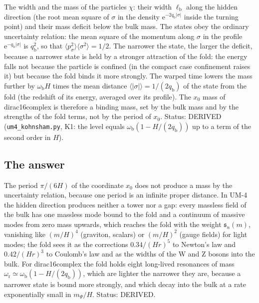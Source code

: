 \documentclass[
  10pt,
]{article}
\begin{document}
The width and the mass of the particles \(\chi\): their width
\(\ell_{\mathrm{b}}\) along the hidden direction (the root mean square
of \(\sigma\) in the density
\(\mathrm{e}^{-2q_{\mathrm{b}}\lvert\sigma\rvert}\) inside the turning
point) and their mass deficit below the bulk mass. The states obey the
ordinary uncertainty relation: the mean square of the momentum along
\(\sigma\) in the profile
\(\mathrm{e}^{-q_{\mathrm{b}}\lvert\sigma\rvert}\) is
\(q_{\mathrm{b}}^2\), so that
\(\langle p_\sigma^2\rangle\langle\sigma^2\rangle = 1/2\). The narrower
the state, the larger the deficit, because a narrower state is held by a
stronger attraction of the fold: the energy falls not because the
particle is confined (in the compact case confinement raises it) but
because the fold binds it more strongly. The warped time lowers the mass
further by \(\omega_{\mathrm{b}}H\) times the mean distance
\(\langle\lvert\sigma\rvert\rangle = 1/(2q_{\mathrm{b}})\) of the state
from the fold (the redshift of its energy, averaged over its profile).
The \(x_0\) mass of dirac16complex is therefore a binding mass, set by
the bulk mass and by the strengths of the fold terms, not by the period
of \(x_0\). Status: DERIVED (\texttt{um4\_kohnsham.py}, K1: the level
equals \(\omega_{\mathrm{b}}(1 - H/(2q_{\mathrm{b}}))\) up to a term of
the second order in \(H\)).

\hypertarget{the-answer}{%
\subsection{The answer}\label{the-answer}}

The period \(\pi/(6H)\) of the coordinate \(x_0\) does not produce a
mass by the uncertainty relation, because one period is an infinite
proper distance. In UM-4 the hidden direction produces neither a tower
nor a gap: every massless field of the bulk has one massless mode bound
to the fold and a continuum of massive modes from zero mass upwards,
which reaches the fold with the weight \(\mathfrak{s}_n(m)\), vanishing
like \((m/H)^4\) (graviton, scalars) or \((m/H)^2\) (gauge fields) for
light modes; the fold sees it as the corrections \(0.34/(Hr)^5\) to
Newton's law and \(0.42/(Hr)^3\) to Coulomb's law and as the widths of
the W and Z bosons into the bulk. For dirac16complex the fold holds
eight long-lived resonances of mass
\(\omega_{\mathrm{r}} \simeq \omega_{\mathrm{b}}(1 - H/(2q_{\mathrm{b}}))\),
which are lighter the narrower they are, because a narrower state is
bound more strongly, and which decay into the bulk at a rate
exponentially small in \(m_\Psi/H\). Status: DERIVED.
\end{document}
